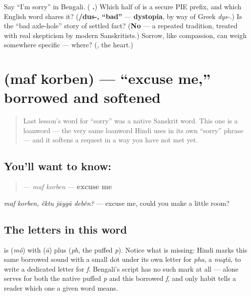 \begin{tcolorbox}[breakable,colback=teal!4,colframe=teal!35!black,title={Before you move on}]
Say \textquotedblleft{}I'm sorry\textquotedblright{} in Bengali. (\textbf{ .}) Which half of  is a secure PIE prefix, and which English word shares it? (\textbf{/dus-, \textquotedblleft{}bad\textquotedblright{}} — \textbf{dystopia}, by way of Greek \emph{dys-}.) Is the \textquotedblleft{}bad axle-hole\textquotedblright{} story of  settled fact? (\textbf{No} — a repeated tradition, treated with real skepticism by modern Sanskritists.) Sorrow, like compassion, can weigh somewhere specific — where? (\textbf{}, the heart.)
\end{tcolorbox}
\section[\texorpdfstring{\bn{মাফ} \bn{করবেন} (maf korben)}{মাফ করবেন (maf korben)}]{  (maf korben) — \textquotedblleft{}excuse me,\textquotedblright{} borrowed and softened}

\label{lesson:BN-C13-maf-korben}



\begin{quote}
Last lesson's word for \textquotedblleft{}sorry\textquotedblright{} was a native Sanskrit word. This one is a loanword — the very same loanword Hindi uses in its own \textquotedblleft{}sorry\textquotedblright{} phrase — and it softens a request in a way you have not met yet.
\end{quote}

\subsection*{You'll want to know:  }
\begin{quote}
\textbf{ } — \emph{maf korben} — \textbf{excuse me}
\end{quote}

\emph{maf korben, êktu jāygā debên?} — excuse me, could you make a little room?

\subsection*{The letters in this word}
\textbf{} is \textbf{} (\emph{mô}) with \textbf{} (\emph{ā}) plus \textbf{} (\emph{ph}, the puffed \emph{p}). Notice what is missing: Hindi marks this same borrowed sound with a small dot under its own letter for \emph{pha}, a \emph{nuqtā}, to write a dedicated letter for \emph{f}. Bengali's script has no such mark at all — \textbf{} alone serves for both the native puffed \emph{p} and this borrowed \emph{f}, and only habit tells a reader which one a given word means.

